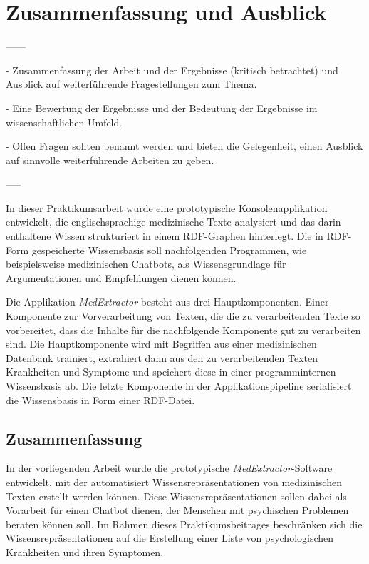 \chapter{Zusammenfassung und Ausblick}
\label{ch:zusammenfassung}


------

- Zusammenfassung der Arbeit und der Ergebnisse (kritisch betrachtet) und Ausblick auf weiterführende Fragestellungen zum Thema.


- Eine Bewertung der Ergebnisse und der Bedeutung der Ergebnisse im wissenschaftlichen Umfeld.


- Offen Fragen sollten benannt werden und bieten die Gelegenheit, einen Ausblick auf sinnvolle weiterführende Arbeiten zu geben.

-----


In dieser Praktikumsarbeit wurde eine prototypische Konsolenapplikation entwickelt, die englischsprachige medizinische Texte analysiert und das darin enthaltene Wissen strukturiert in einem RDF-Graphen hinterlegt. Die in RDF-Form gespeicherte Wissensbasis soll nachfolgenden Programmen, wie beispielsweise medizinischen Chatbots, als Wissensgrundlage für Argumentationen und Empfehlungen dienen können.

Die Applikation \emph{MedExtractor} besteht aus drei Hauptkomponenten. Einer Komponente zur Vorverarbeitung von Texten, die die zu verarbeitenden Texte so vorbereitet, dass die Inhalte für die nachfolgende Komponente gut zu verarbeiten sind. Die Hauptkomponente wird mit Begriffen aus einer medizinischen Datenbank trainiert, extrahiert dann aus den zu verarbeitenden Texten Krankheiten und Symptome und speichert diese in einer programminternen Wissensbasis ab. Die letzte Komponente in der Applikationspipeline serialisiert die Wissensbasis in Form einer RDF-Datei.


\section{Zusammenfassung}
\label{sec:Zusammenfassung} 

In der vorliegenden Arbeit wurde die prototypische \emph{MedExtractor}-Software entwickelt, mit der automatisiert Wissensrepräsentationen von medizinischen Texten erstellt werden können. Diese Wissensrepräsentationen sollen dabei als Vorarbeit für einen Chatbot dienen, der Menschen mit psychischen Problemen beraten können soll. Im Rahmen dieses Praktikumsbeitrages beschränken sich die Wissensrepräsentationen auf die Erstellung einer Liste von psychologischen Krankheiten und ihren Symptomen. 

